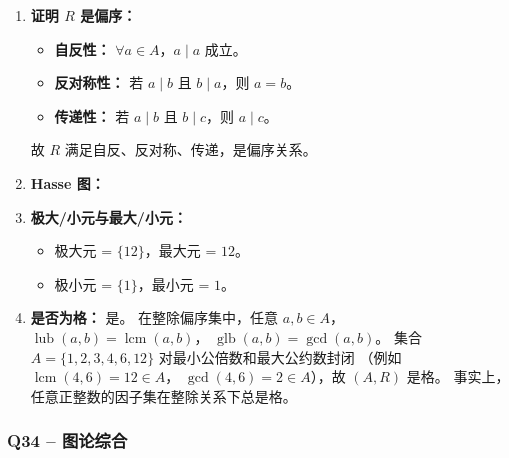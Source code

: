 \documentclass[11pt,a4paper,fontset=mac]{ctexart}
\begin{document}
\begin{enumerate}[label=(\alph*)]
  \item \textbf{证明 $R$ 是偏序：}
  \begin{itemize}
    \item \textbf{自反性：} $\forall a\in A$，$a\mid a$ 成立。
    \item \textbf{反对称性：} 若 $a\mid b$ 且 $b\mid a$，则 $a=b$。
    \item \textbf{传递性：} 若 $a\mid b$ 且 $b\mid c$，则 $a\mid c$。
  \end{itemize}
  故 $R$ 满足自反、反对称、传递，是偏序关系。

  \item \textbf{Hasse 图：}
  \begin{center}
  \end{center}

  \item \textbf{极大/小元与最大/小元：}
  \begin{itemize}
    \item 极大元 = $\{12\}$，最大元 = $12$。
    \item 极小元 = $\{1\}$，最小元 = $1$。
  \end{itemize}

  \item \textbf{是否为格：} 是。
  在整除偏序集中，任意 $a,b\in A$，
  $\operatorname{lub}(a,b)=\operatorname{lcm}(a,b)$，
  $\operatorname{glb}(a,b)=\gcd(a,b)$。
  集合 $A=\{1,2,3,4,6,12\}$ 对最小公倍数和最大公约数封闭
  （例如 $\operatorname{lcm}(4,6)=12\in A$，
  $\gcd(4,6)=2\in A$），故 $(A,R)$ 是格。
  事实上，任意正整数的因子集在整除关系下总是格。
\end{enumerate}

\subsubsection*{Q34 \;--\; 图论综合}
\end{document}
